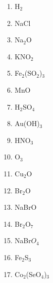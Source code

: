 \begin{enumerate}
\begin{multicols}{3}
\begin{enumerate}
    \item H$_2$
    \item NaCl
    \item Na$_2$O
    \item KNO$_2$
    \item Fe$_2$(SO$_2$)$_3$
    \item MnO
    \item H$_2$SO$_4$
    \item Au(OH)$_3$
    \item HNO$_3$
    \item O$_3$
    \item Cu$_2$O
    \item Br$_2$O
    \item NaBrO
    \item Br$_2$O$_7$
    \item NaBr$O_4$
    \item Fe$_2$S$_3$
    \item Co$_2$(SeO$_4$)$_3$
\end{enumerate}
\end{multicols}
\end{enumerate}
